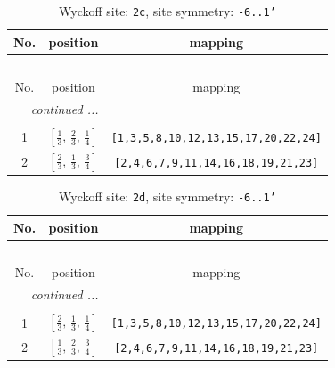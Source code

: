 \documentclass[fleqn,8pt]{jsarticle}
\begin{document}
\renewcommand{\arraystretch}{1.2}
\begin{longtable}{ccc}
\caption{Wyckoff site: {\tt 2c}, site symmetry: {\tt -6..1'}}
 \\
 \hline \hline
No. & position & mapping \\ \hline \endfirsthead

\multicolumn{2}{l}{\tablename\ \thetable{}} \\
 \hline \hline
No. & position & mapping \\ \hline \endhead

 \hline \hline
\multicolumn{2}{r}{\footnotesize\it continued ...} \\ \endfoot

 \hline \hline
\multicolumn{2}{r}{} \\ \endlastfoot

1 & $\left[ \frac{1}{3},\, \frac{2}{3},\, \frac{1}{4} \right]$ & {\tt [1,3,5,8,10,12,13,15,17,20,22,24]} \\ \hline
2 & $\left[ \frac{2}{3},\, \frac{1}{3},\, \frac{3}{4} \right]$ & {\tt [2,4,6,7,9,11,14,16,18,19,21,23]} \\
\end{longtable}
\renewcommand{\arraystretch}{1.2}
\begin{longtable}{ccc}
\caption{Wyckoff site: {\tt 2d}, site symmetry: {\tt -6..1'}}
 \\
 \hline \hline
No. & position & mapping \\ \hline \endfirsthead

\multicolumn{2}{l}{\tablename\ \thetable{}} \\
 \hline \hline
No. & position & mapping \\ \hline \endhead

 \hline \hline
\multicolumn{2}{r}{\footnotesize\it continued ...} \\ \endfoot

 \hline \hline
\multicolumn{2}{r}{} \\ \endlastfoot

1 & $\left[ \frac{2}{3},\, \frac{1}{3},\, \frac{1}{4} \right]$ & {\tt [1,3,5,8,10,12,13,15,17,20,22,24]} \\ \hline
2 & $\left[ \frac{1}{3},\, \frac{2}{3},\, \frac{3}{4} \right]$ & {\tt [2,4,6,7,9,11,14,16,18,19,21,23]} \\
\end{longtable}
\renewcommand{\arraystretch}{1.2}
\end{document}
